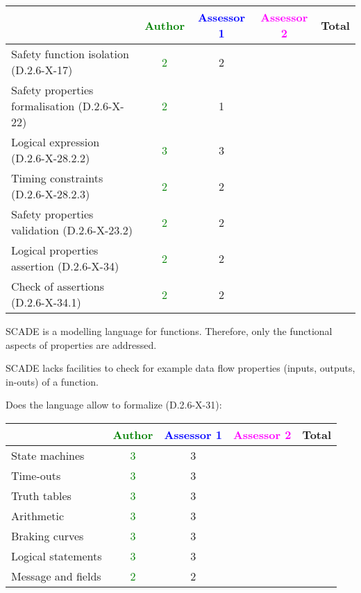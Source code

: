 \begin{tabular}{|l | c | c | c | c|}
\hline
& \textcolor{green}{Author} & \textcolor{blue}{Assessor 1} & \textcolor{magenta}{Assessor 2} & Total \\
\hline 
Safety function isolation (D.2.6-X-17)  &  \textcolor{green}{2}& 2 & &  \\
\hline 
Safety properties formalisation (D.2.6-X-22)  &  \textcolor{green}{2}&
1 & &  \\
\hline
Logical expression (D.2.6-X-28.2.2)  &  \textcolor{green}{3}& 3 & &  \\
\hline
Timing constraints (D.2.6-X-28.2.3)  &  \textcolor{green}{2} & 2 & &  \\
\hline
Safety properties validation (D.2.6-X-23.2)  &  \textcolor{green}{2}& 2 & &  \\
\hline
Logical properties assertion (D.2.6-X-34)  &  \textcolor{green}{2}& 2 & &  \\
\hline
Check  of assertions (D.2.6-X-34.1)  &  \textcolor{green}{2}& 2 & &  \\
\hline
\end{tabular}

\begin{author_comment}
SCADE is a modelling language for functions. Therefore, only the functional aspects of properties are addressed.  
\end{author_comment}


\begin{assessor1}
  SCADE lacks facilities to check for example data flow properties
  (inputs, outputs, in-outs) of a function.
\end{assessor1}


Does the language allow to  formalize (D.2.6-X-31):

\begin{tabular}{|l | c | c | c | c|}
\hline
& \textcolor{green}{Author} & \textcolor{blue}{Assessor 1} & \textcolor{magenta}{Assessor 2} & Total \\
\hline 
State machines  & \textcolor{green}{3} & 3 & &  \\
\hline
Time-outs  & \textcolor{green}{3} & 3 & &  \\
\hline
Truth tables  & \textcolor{green}{3} & 3 & &  \\
\hline
Arithmetic  & \textcolor{green}{3} & 3 & &  \\
\hline
Braking curves  & \textcolor{green}{3} & 3 & &  \\
\hline
Logical statements & \textcolor{green}{3} & 3 & &  \\
\hline
Message and fields & \textcolor{green}{2} & 2 & &  \\
\hline
\end{tabular}

